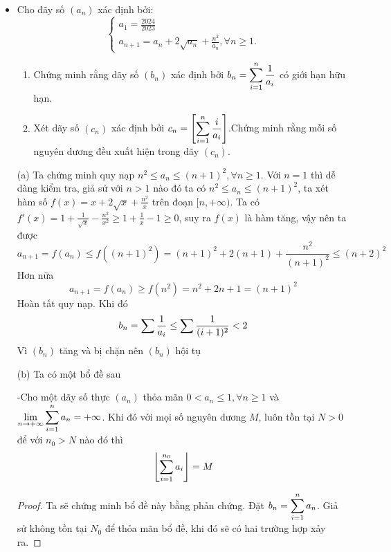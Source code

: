 \documentclass[11pt]{scrartcl}
\begin{document}
\begin{itemize}[label=, leftmargin=0em, itemsep=0.5em]
    
    \item \begin{bt}
        Cho đãy số $\left(a_n\right)$ xác định bởi: \[\left\{\begin{array}{l}a_1=\frac{2024}{2023} \\ a_{n+1}=a_n+2 \sqrt{a_n}+\frac{n^2}{a_n}, \forall n \geq 1 .\end{array}\right.\]
        \begin{enumerate}[label=(\alph*)]
            \item Chứng minh rằng dãy số $\left(b_n\right)$ xác định bởi $b_n=\dsum_{i=1}^n \frac{1}{a_i}$ có giới hạn hữu hạn.
            \item Xét dãy số $\left(c_n\right)$ xác định bởi $c_n=\left[\dsum_{i=1}^n \frac{i}{a_i}\right]$.Chứng minh rằng mỗi số nguyên dương đều xuất hiện trong dãy $\left(c_n\right)$.
        \end{enumerate}
        
    \end{bt}
    \begin{sol}

        (a) Ta chứng minh quy nạp $n^2 \leq a_n \leq (n + 1)^2, \forall n \geq 1$. Với $n = 1$ thì dễ dàng kiểm tra, giả sử với $n > 1$ nào đó ta có $n^2 \leq a_n \leq (n +1)^2$, ta xét hàm số $f(x) = x + 2\sqrt{x} + \frac{n^2}{x}$ trên đoạn $[n, +\infty)$. Ta có $f'(x) = 1 + \frac{1}{\sqrt{x}} - \frac{n^2}{x^2} \geq 1 + \frac{1}{x} - 1 \geq 0$, suy ra $f(x)$ là hàm tăng, vậy nên ta được 
        \[
        a_{n + 1} = f(a_n) \leq f((n + 1)^2) = (n + 1)^2 + 2(n + 1) + \frac{n^2}{(n + 1)^2} \leq (n + 2)^2
        \]
        Hơn nữa 
        \[
        a_{n + 1} = f(a_n) \geq f(n^2) = n^2 + 2n + 1 = (n + 1)^2
        \]
        Hoàn tất quy nạp. Khi đó 
        \[
            b_n = \dsum \frac{1}{a_i} \leq \dsum \frac{1}{(i + 1)^2} < 2
        \]
        Vì $(b_n)$ tăng và bị chặn nên $(b_n)$ hội tụ
        
        (b) 
        Ta có một bổ đề sau 
        \begin{theo}
            -Cho một dãy số thực $(a_n)$ thỏa mãn $0 < a_n \leq 1, \forall n \geq 1$ và $\displaystyle\lim_{n \to +\infty} \displaystyle\sum_{i = 1}^n a_n = +\infty$. Khi đó với mọi số nguyên dương $M$, luôn tồn tại $N > 0$ để với $n_0 > N$ nào đó thì 
            \[
            \left\lfloor \displaystyle\sum_{i = 1}^{n_0} a_i \right\rfloor = M
            \]
        \end{theo}
        \begin{proof} Ta sẽ chứng minh bổ đề này bằng phản chứng. Đặt $b_n = \displaystyle\sum_{i = 1}^n a_n$. Giả sử không tồn tại $N_0$ để thỏa mãn bổ đề, khi đó sẽ có hai trường hợp xảy ra. 


\end{proof}
\end{sol}
\end{itemize}
\end{document}

